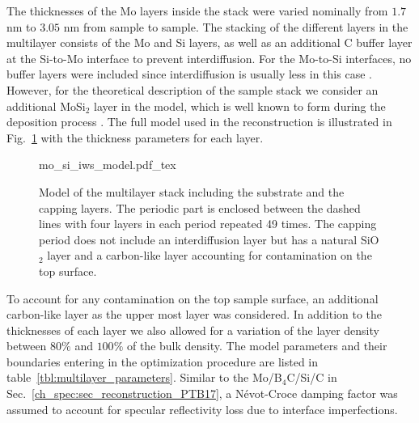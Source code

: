 The thicknesses of the Mo layers inside the stack were varied nominally from $1.7$ nm to $3.05$ nm from sample to sample. The stacking of the different layers in the multilayer consists of the Mo and Si layers, as well as an additional C buffer layer at the Si-to-Mo interface to prevent interdiffusion. For the Mo-to-Si interfaces, no buffer layers were included since interdiffusion is usually less in this case \cite{petford-long_highresolution_1987}. However, for the theoretical description of the sample stack we consider an additional MoSi$_2$ layer in the model, which is well known to form during the deposition process \cite{bajt_investigation_2001}. The full model used in the reconstruction is illustrated in Fig.~\ref{ch_spec:fig_model_unpolished_and_polished_samples} with the thickness parameters for each layer.
\begin{figure}[htbp]
    \def\svgwidth{0.7\textwidth}
    \selectfont\footnotesize
    {mo_si_iws_model.pdf_tex}
    \caption{Model of the multilayer stack including the substrate and the capping layers. The periodic part is enclosed between the dashed lines with four layers in each period repeated 49 times. The capping period does not include an interdiffusion layer but has a natural SiO$_2$ layer and a carbon-like layer accounting for contamination on the top surface.}
    \label{ch_spec:fig_model_unpolished_and_polished_samples}
\end{figure}
To account for any contamination on the top sample surface, an additional carbon-like layer as the upper most layer was considered. In addition to the thicknesses of each layer we also allowed for a variation of the layer density between $80\%$ and $100\%$ of the bulk density. The model parameters and their boundaries entering in the optimization procedure are listed in table~\ref{tbl:multilayer_parameters}. Similar to the Mo/B$_4$C/Si/C in Sec.~\ref{ch_spec:sec_reconstruction_PTB17}, a N\'{e}vot-Croce damping factor was assumed to account for specular reflectivity loss due to interface imperfections. 
